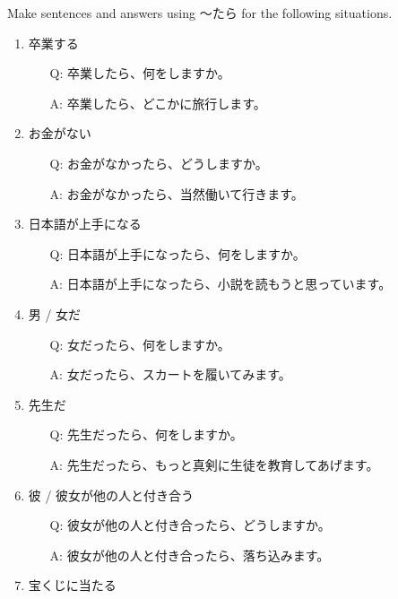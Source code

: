 \documentclass[notoc,notitlepage]{tufte-book}
\begin{document}
\begin{ex}
  Make sentences and answers using 〜たら for the following situations.
  \begin{enumerate}
    \item 卒業する
      \begin{itemize}
        \item[Q: ] 卒業したら、何をしますか。
        \item[A: ] 卒業したら、どこかに旅行します。
      \end{itemize}
    \item お金がない
      \begin{itemize}
        \item[Q: ] お金がなかったら、どうしますか。
        \item[A: ] お金がなかったら、当然働いて行きます。
      \end{itemize}
    \item 日本語が上手になる
      \begin{itemize}
        \item[Q: ] 日本語が上手になったら、何をしますか。
        \item[A: ] 日本語が上手になったら、小説を読もうと思っています。
      \end{itemize}
    \item 男 / 女だ
      \begin{itemize}
        \item[Q: ] 女だったら、何をしますか。
        \item[A: ] 女だったら、スカートを履いてみます。
      \end{itemize}
    \item 先生だ
      \begin{itemize}
        \item[Q: ] 先生だったら、何をしますか。
        \item[A: ] 先生だったら、もっと真剣に生徒を教育してあげます。
      \end{itemize}
    \item 彼 / 彼女が他の人と付き合う
      \begin{itemize}
        \item[Q: ] 彼女が他の人と付き合ったら、どうしますか。
        \item[A: ] 彼女が他の人と付き合ったら、落ち込みます。
      \end{itemize}
    \item 宝くじに当たる

\end{enumerate}
\end{ex}
\end{document}
